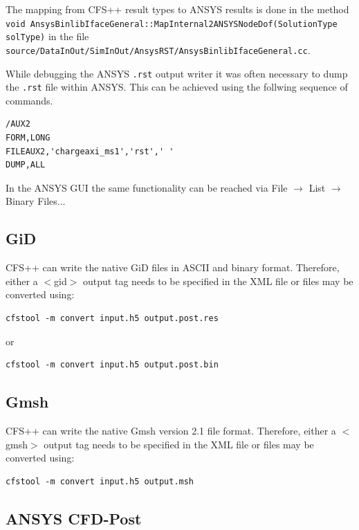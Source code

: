 The mapping  from CFS++ result  types to ANSYS  results is done in  the method
{\tt    void    AnsysBinlibIfaceGeneral::MapInternal2ANSYSNodeDof(SolutionType
solType)}                    in                    the                    file
{\tt source/DataInOut/SimInOut/AnsysRST/AnsysBinlibIfaceGeneral.cc}.

While debugging the  ANSYS {\tt .rst} output writer it  was often necessary to
dump the {\tt .rst} file within ANSYS. This can be achieved using the follwing
sequence of commands.
%
\begin{verbatim}
/AUX2   
FORM,LONG   
FILEAUX2,'chargeaxi_ms1','rst',' '  
DUMP,ALL
\end{verbatim}
%
In the ANSYS GUI the same  functionality can be reached via File $\rightarrow$
List $\rightarrow$ Binary Files...

\subsection{GiD}

CFS++ can  write the native GiD  files in ASCII and  binary format. Therefore,
either a $<$gid$>$ output tag needs to be specified in the XML file or files may
be converted using:

\begin{verbatim}
cfstool -m convert input.h5 output.post.res
\end{verbatim}

or

\begin{verbatim}
cfstool -m convert input.h5 output.post.bin
\end{verbatim}

\subsection{Gmsh}
\label{sec:postproc_gmsh}
CFS++ can write  the native Gmsh version 2.1 file  format. Therefore, either a
$<$gmsh$>$ output  tag needs to  be specified  in the XML  file or files  may be
converted using:

\begin{verbatim}
cfstool -m convert input.h5 output.msh
\end{verbatim}

\subsection{ANSYS CFD-Post}
\label{sec:postproc_cfdpost}


